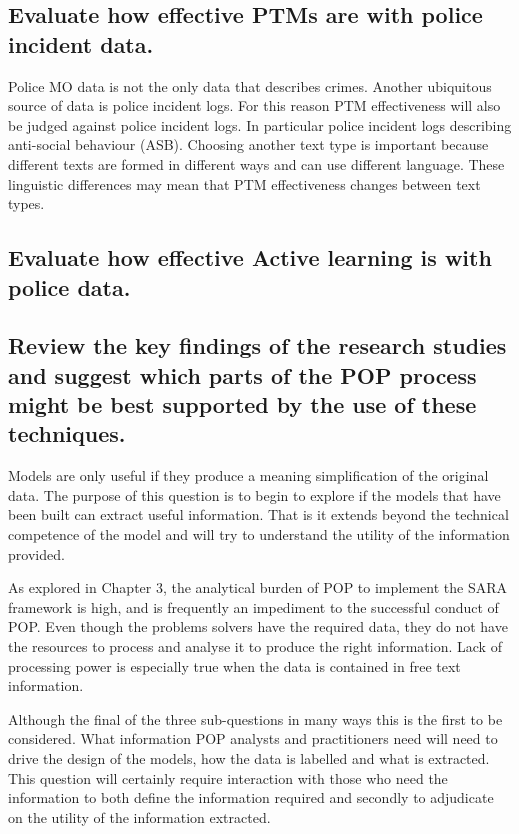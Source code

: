 \subsection{Evaluate how effective PTMs are with police incident data.} Police MO data is not the only data that describes crimes. Another ubiquitous source of data is police incident logs. For this reason PTM effectiveness will also be judged against police incident logs. In particular police incident logs describing anti-social behaviour (ASB). Choosing another text type is important because different texts are formed in different ways and can use different language. These linguistic differences may mean that PTM effectiveness changes between text types.  

\subsection{Evaluate how effective Active learning is with police data.}

\subsection{Review the key findings of the research studies and suggest which parts of the POP process might be best supported by the use of these techniques.}

Models are only useful if they produce a meaning simplification of the original data. The purpose of this question is to begin to explore if the models that have been built can extract useful information. That is it extends beyond the technical competence of the model and will try to understand the utility of the information provided. 

As explored in Chapter 3, the analytical burden of POP to implement the SARA framework is high, and is frequently an impediment to the successful conduct of POP. Even though the problems solvers have the required data, they do not have the resources to process and analyse it to produce the right information. Lack of processing power is especially true when the data is contained in free text information. 

Although the final of the three sub-questions in many ways this is the first to be considered. What information POP analysts and practitioners need will need to drive the design of the models, how the data is labelled and what is extracted. This question will certainly require interaction with those who need the information to both define the information required and secondly to adjudicate on the utility of the information extracted.

